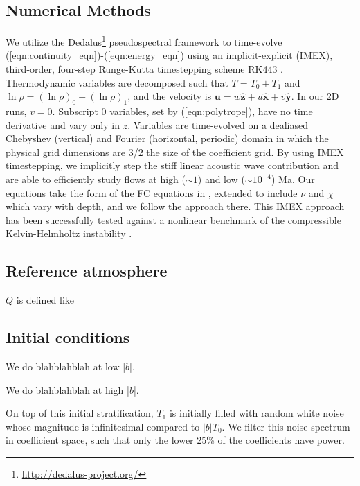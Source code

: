 \documentclass[twocolumn, amsmath, amsfonts, amssymb]{aastex62}
\begin{document}
\subsection{Numerical Methods}
\label{sec:numerics}
We utilize the 
Dedalus\footnote{\url{http://dedalus-project.org/}} 
pseudospectral framework \cite{burns&all2016} to time-evolve  
(\ref{eqn:continuity_eqn})-(\ref{eqn:energy_eqn}) 
using an implicit-explicit (IMEX), third-order, four-step 
Runge-Kutta timestepping scheme RK443 \cite{ascher&all1997}.  
Thermodynamic variables are decomposed such that $T = T_0 + T_1$ and
$\ln\rho = (\ln\rho)_0 + (\ln\rho)_1$, 
and the velocity is $\bm{u} = w\bm{\hat{z}} + u\bm{\hat{x}} + v\bm{\hat{y}}$.
In our 2D runs, $v = 0$.
Subscript 0 variables, set by (\ref{eqn:polytrope}), 
have no time derivative and vary only in $z$.
Variables are time-evolved on a dealiased Chebyshev (vertical)
and Fourier (horizontal, periodic) domain in which the
physical grid dimensions are 3/2 the size of the coefficient grid.  
By using IMEX timestepping, we implicitly step the 
stiff linear acoustic wave contribution and are able to
efficiently study flows at high ($\sim 1$) 
and low ($\sim 10^{-4}$) Ma.  Our equations take the form
of the FC equations in \cite{lecoanet&all2014}, extended to include
$\nu$ and $\chi$ which vary with depth, and we follow the approach there.
This IMEX approach has been successfully 
tested against a nonlinear benchmark  of the compressible 
Kelvin-Helmholtz instability \cite{Lecoanet_et_al_2016_KH}.

\subsection{Reference atmosphere}
\label{sec:atmosphere}



$Q$ is defined like 


\subsection{Initial conditions}
We do blahblahblah at low |$b$|.

We do blahblahblah at high |$b$|.

On top of this initial stratification, $T_1$ is initially filled with
random white noise whose magnitude is infinitesimal
compared to $|b| T_0$.
We filter this noise spectrum in coefficient space, 
such that only the lower 25\% of the coefficients
have power. 
\end{document}
